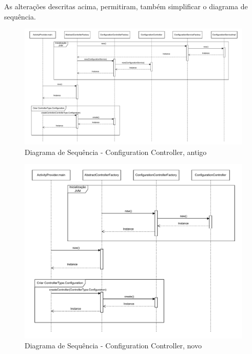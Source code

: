 \documentclass[12pt,a4paper,final]{article}
\begin{document}
    \noindent As alterações descritas acima, permitiram, também simplificar o diagrama de sequência.

    \begin{figure}[H]
        \centering
        \includegraphics[width=\textwidth]{diagramas_padroes_criacao-old.drawio}
        \caption{Diagrama de Sequência - Configuration Controller, antigo}
        \label{fig:dscca}
    \end{figure}

    \begin{figure}[H]
        \centering
        \includegraphics[width=\textwidth]{diagramas_padroes_criacao-new.drawio}
        \caption{Diagrama de Sequência - Configuration Controller, novo}
        \label{fig:dsccn}
    \end{figure}

    \newpage
    \printbibliography
\end{document}
